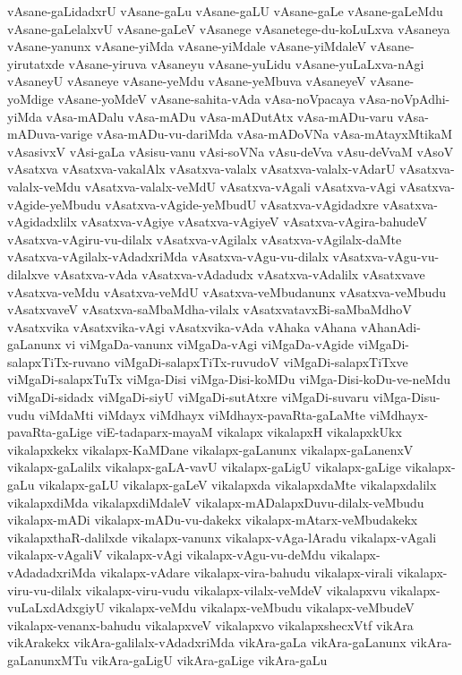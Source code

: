 {vAsane-gaLidadxrU
vAsane-gaLu
vAsane-gaLU
vAsane-gaLe
vAsane-gaLeMdu
vAsane-gaLelalxvU
vAsane-gaLeV
vAsanege
vAsanetege-du-koLuLxva
vAsaneya
vAsane-yanunx
vAsane-yiMda
vAsane-yiMdale
vAsane-yiMdaleV
vAsane-yirutatxde
vAsane-yiruva
vAsaneyu
vAsane-yuLidu
vAsane-yuLaLxva-nAgi
vAsaneyU
vAsaneye
vAsane-yeMdu
vAsane-yeMbuva
vAsaneyeV
vAsane-yoMdige
vAsane-yoMdeV
vAsane-sahita-vAda
vAsa-noVpacaya
vAsa-noVpAdhi-yiMda
vAsa-mADalu
vAsa-mADu
vAsa-mADutAtx
vAsa-mADu-varu
vAsa-mADuva-varige
vAsa-mADu-vu-dariMda
vAsa-mADoVNa
vAsa-mAtayxMtikaM
vAsasivxV
vAsi-gaLa
vAsisu-vanu
vAsi-soVNa
vAsu-deVva
vAsu-deVvaM
vAsoV
vAsatxva
vAsatxva-vakalAlx
vAsatxva-valalx
vAsatxva-valalx-vAdarU
vAsatxva-valalx-veMdu
vAsatxva-valalx-veMdU
vAsatxva-vAgali
vAsatxva-vAgi
vAsatxva-vAgide-yeMbudu
vAsatxva-vAgide-yeMbudU
vAsatxva-vAgidadxre
vAsatxva-vAgidadxlilx
vAsatxva-vAgiye
vAsatxva-vAgiyeV
vAsatxva-vAgira-bahudeV
vAsatxva-vAgiru-vu-dilalx
vAsatxva-vAgilalx
vAsatxva-vAgilalx-daMte
vAsatxva-vAgilalx-vAdadxriMda
vAsatxva-vAgu-vu-dilalx
vAsatxva-vAgu-vu-dilalxve
vAsatxva-vAda
vAsatxva-vAdadudx
vAsatxva-vAdalilx
vAsatxvave
vAsatxva-veMdu
vAsatxva-veMdU
vAsatxva-veMbudanunx
vAsatxva-veMbudu
vAsatxvaveV
vAsatxva-saMbaMdha-vilalx
vAsatxvatavxBi-saMbaMdhoV
vAsatxvika
vAsatxvika-vAgi
vAsatxvika-vAda
vAhaka
vAhana
vAhanAdi-gaLanunx
vi
viMgaDa-vanunx
viMgaDa-vAgi
viMgaDa-vAgide
viMgaDi-salapxTiTx-ruvano
viMgaDi-salapxTiTx-ruvudoV
viMgaDi-salapxTiTxve
viMgaDi-salapxTuTx
viMga-Disi
viMga-Disi-koMDu
viMga-Disi-koDu-ve-neMdu
viMgaDi-sidadx
viMgaDi-siyU
viMgaDi-sutAtxre
viMgaDi-suvaru
viMga-Disu-vudu
viMdaMti
viMdayx
viMdhayx
viMdhayx-pavaRta-gaLaMte
viMdhayx-pavaRta-gaLige
viE-tadaparx-mayaM
vikalapx
vikalapxH
vikalapxkUkx
vikalapxkekx
vikalapx-KaMDane
vikalapx-gaLanunx
vikalapx-gaLanenxV
vikalapx-gaLalilx
vikalapx-gaLA-vavU
vikalapx-gaLigU
vikalapx-gaLige
vikalapx-gaLu
vikalapx-gaLU
vikalapx-gaLeV
vikalapxda
vikalapxdaMte
vikalapxdalilx
vikalapxdiMda
vikalapxdiMdaleV
vikalapx-mADalapxDuvu-dilalx-veMbudu
vikalapx-mADi
vikalapx-mADu-vu-dakekx
vikalapx-mAtarx-veMbudakekx
vikalapxthaR-dalilxde
vikalapx-vanunx
vikalapx-vAga-lAradu
vikalapx-vAgali
vikalapx-vAgaliV
vikalapx-vAgi
vikalapx-vAgu-vu-deMdu
vikalapx-vAdadadxriMda
vikalapx-vAdare
vikalapx-vira-bahudu
vikalapx-virali
vikalapx-viru-vu-dilalx
vikalapx-viru-vudu
vikalapx-vilalx-veMdeV
vikalapxvu
vikalapx-vuLaLxdAdxgiyU
vikalapx-veMdu
vikalapx-veMbudu
vikalapx-veMbudeV
vikalapx-venanx-bahudu
vikalapxveV
vikalapxvo
vikalapxshecxVtf
vikAra
vikArakekx
vikAra-galilalx-vAdadxriMda
vikAra-gaLa
vikAra-gaLanunx
vikAra-gaLanunxMTu
vikAra-gaLigU
vikAra-gaLige
vikAra-gaLu
}
